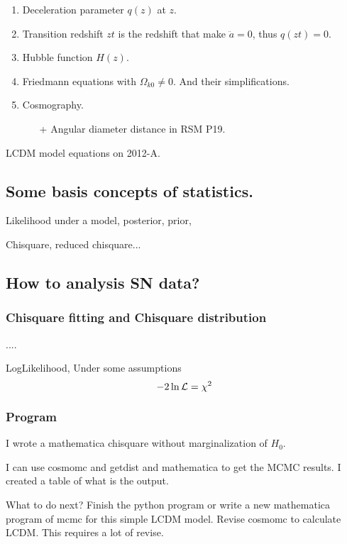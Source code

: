 \documentclass[12pt,a4paper]{article}
\begin{document}
\begin{enumerate}[\bf\tiny{TR-BE}-1]
\item
Deceleration parameter $q(z)$ at $z$.

\item
Transition redshift $zt$ is the redshift that make $\ddot a = 0$, thus $q(zt)=0$.

\item
Hubble function $H(z)$.

\item
Friedmann equations with $\Omega_{k0}\neq 0$. And their simplifications.

\item
Cosmography.
\begin{itemize}
\item[{\small +}]
Angular diameter distance in RSM P19.

\end{itemize}

\end{enumerate}



LCDM model equations on {\CN} 2012-A.



\subsection{Some basis concepts of statistics.}

Likelihood under a model, posterior, prior, 

Chisquare, reduced chisquare...


\subsection{How to analysis SN data?}

\subsubsection{Chisquare fitting and Chisquare distribution}

....


LogLikelihood, Under some assumptions
\begin{equation}
	-2\ln {\cal L} =\chi^2 
\end{equation}


\subsubsection{Program}


I wrote a mathematica chisquare without marginalization of $H_0$.

I can use cosmomc and getdist and mathematica to get the MCMC results. I created a table of what is the output.


What to do next?
Finish the python program or write a new mathematica program of mcmc for this simple LCDM model.
Revise cosmomc to calculate LCDM. This requires a lot of revise.
\end{document}
